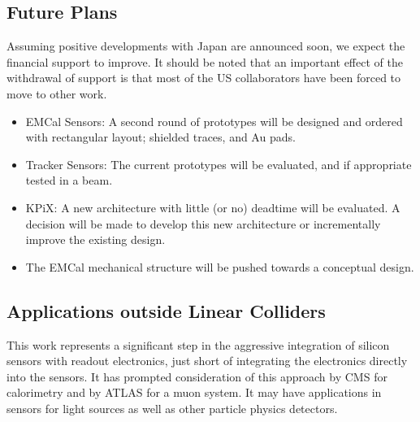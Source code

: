 \subsection{Future Plans}
Assuming positive developments with Japan are announced soon, we expect the financial support to improve. It should be noted that an important effect of the withdrawal of support is that most of the US collaborators have been forced to move to other work.
\begin{itemize}
	\item EMCal Sensors: A second round of prototypes will be designed and ordered with rectangular layout; shielded traces, and Au pads.
	\item Tracker Sensors: The current prototypes will be evaluated, and if appropriate tested in a beam.
	\item KPiX: A new architecture with little (or no) deadtime will be evaluated. A decision will be made to develop this new architecture or incrementally improve the existing design.
	\item The EMCal mechanical structure will be pushed towards a conceptual design.
\end{itemize}
\subsection{Applications outside Linear Colliders}
This work represents a significant step in the aggressive integration of silicon sensors with readout electronics, just short of integrating the electronics directly into the sensors. It has prompted consideration of this approach by CMS for calorimetry and by ATLAS for a muon system.  It may have applications in sensors for light sources as well as other particle physics detectors.

